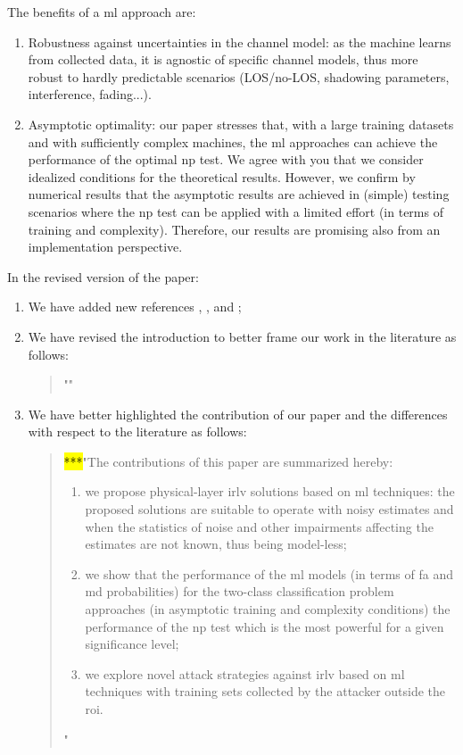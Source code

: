 \documentclass[draftcls,onecolumn,12pt]{IEEEtran}
\newcounter{revc}
\newcommand{\revp}[1]{\zref[revcontent]{#1}}
\begin{document}
The benefits of a \ac{ml} approach are:
\begin{enumerate}
    \item Robustness against uncertainties in the channel model: as the machine learns from collected data, it is agnostic of specific channel models, thus more robust to hardly predictable scenarios (LOS/no-LOS, shadowing parameters, interference, fading...).
    \item Asymptotic optimality: our paper stresses that, with a large training datasets and with sufficiently complex machines, the \ac{ml} approaches can achieve the performance of the optimal \ac{np} test. We agree with you that we consider idealized conditions for the theoretical results. However, we confirm by numerical results that the asymptotic results are achieved in (simple) testing scenarios where the \ac{np} test can be applied with a limited effort (in terms of training and complexity). Therefore, our results are promising also from an implementation perspective.
\end{enumerate}

In the revised version of the paper:
\begin{enumerate}
    \item We have added new references \cite{7398138}, \cite{singelee2005location},  and \cite{song2008secure};
    \item We have revised the introduction to better frame our work in the literature as follows:
    \begin{quote}
"\revp{rev2lit}\revp{rev3cit}\revp{rev2lit2}"
\end{quote} 
\item We have better highlighted the contribution of our paper and the differences with respect to the literature as follows:
\begin{quote}
\hl{***}"The contributions of this paper are summarized hereby:
\begin{enumerate}
    \item we propose physical-layer \ac{irlv} solutions based on \ac{ml} techniques: the proposed solutions are suitable to operate with noisy estimates and when the statistics of noise and other impairments affecting the estimates are not known, thus being  model-less;
    \item we show that the performance of the \ac{ml} models (in terms of \ac{fa} and \ac{md} probabilities) for the two-class classification problem approaches (in asymptotic training and complexity conditions) the performance of the \ac{np} test which is the most powerful for a given significance level;
    \item we explore novel attack strategies against \ac{irlv} based on \ac{ml} techniques with training sets collected by the attacker outside the \ac{roi}.
\end{enumerate}
\revp{lit2}"
\end{quote} 
\end{enumerate}
 
\end{document}
